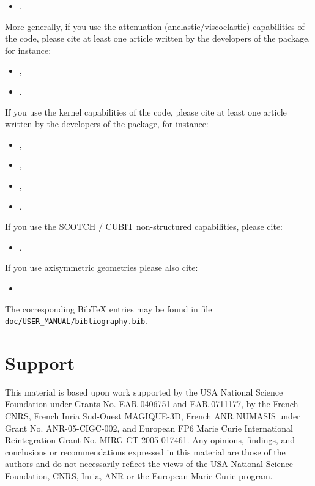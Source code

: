%
\begin{itemize}
\item \cite{KoXiBoPeSaLiTr16}.
\end{itemize}
%
More generally, if you use the attenuation (anelastic/viscoelastic) capabilities of the code, please cite at least one article
written by the developers of the package, for instance:
%
\begin{itemize}
\item \cite{KoXiBoPeSaLiTr16},
\item \cite{BlKoChLoXi16}.
\end{itemize}
%
If you use the kernel capabilities of the code, please cite at least one article
written by the developers of the package, for instance:
%
\begin{itemize}
\item \cite{TrKoLi08},
\item \cite{PeKoLuMaLeCaLeMaLiBlNiBaTr11},
\item \cite{LiTr06},
\item \cite{MoLuTr09}.
\end{itemize}
%
If you use the SCOTCH / CUBIT non-structured capabilities, please cite:
%
\begin{itemize}
\item \cite{MaKoBlLe08}.
\end{itemize}
%
If you use axisymmetric geometries please also cite:
\begin{itemize}
 \item \cite{BoCrKoAs16}
\end{itemize}
%
The corresponding Bib\TeX{} entries may be found
in file \texttt{doc/USER\_MANUAL/bibliography.bib}.



\section{Support}

This material is based upon work supported by the USA National Science
Foundation under Grants No. EAR-0406751 and EAR-0711177, by the French
CNRS, French Inria Sud-Ouest MAGIQUE-3D, French ANR NUMASIS under
Grant No. ANR-05-CIGC-002, and European FP6 Marie Curie International
Reintegration Grant No. MIRG-CT-2005-017461.
Any opinions, findings, and conclusions or recommendations expressed in this material are
those of the authors and do not necessarily reflect the views of the
USA National Science Foundation, CNRS, Inria, ANR or the European
Marie Curie program.


